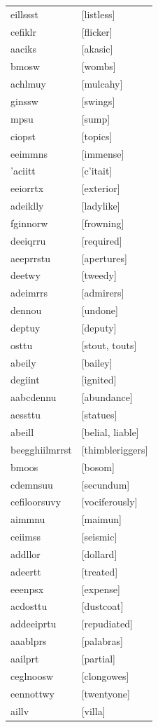 \documentclass{article}
\begin{document}
\begin{tabular}{ll}
eillssst & [listless] \\
cefiklr & [flicker] \\
aaciks & [akasic] \\
bmosw & [wombs] \\
achlmuy & [mulcahy] \\
ginssw & [swings] \\
mpsu & [sump] \\
ciopst & [topics] \\
eeimmns & [immense] \\
'aciitt & [c'itait] \\
eeiorrtx & [exterior] \\
adeiklly & [ladylike] \\
fginnorw & [frowning] \\
deeiqrru & [required] \\
aeeprrstu & [apertures] \\
deetwy & [tweedy] \\
adeimrrs & [admirers] \\
dennou & [undone] \\
deptuy & [deputy] \\
osttu & [stout, touts] \\
abeily & [bailey] \\
degiint & [ignited] \\
aabcdennu & [abundance] \\
aessttu & [statues] \\
abeill & [belial, liable] \\
beegghiilmrrst & [thimbleriggers] \\
bmoos & [bosom] \\
cdemnsuu & [secundum] \\
cefiloorsuvy & [vociferously] \\
aimmnu & [maimun] \\
ceiimss & [seismic] \\
addllor & [dollard] \\
adeertt & [treated] \\
eeenpsx & [expense] \\
acdosttu & [dustcoat] \\
addeeiprtu & [repudiated] \\
aaablprs & [palabras] \\
aailprt & [partial] \\
ceglnoosw & [clongowes] \\
eennottwy & [twentyone] \\
aillv & [villa] \\

\end{tabular}
\end{document}
